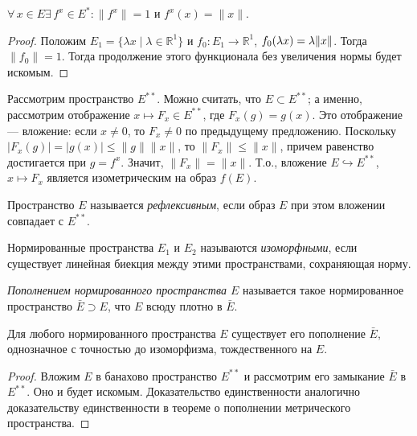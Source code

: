 \documentclass[12pt,titlepage, a4paper]{article}
\begin{document}
\begin{predl}
$\forall\,x\in E$\;\;$\exists\,f^x\in E^*:\|f^x\|=1$ и
$f^x(x)=\|x\|$.
\end{predl}

\begin{proof}
Положим $E_1=\{\lambda x\mid \lambda\in\mathbb{R}^1\}$ и $f_0\colon
E_1\to\mathbb{R}^1$, $f_0(\lambda x)\p=\lambda\|x\|$. Тогда
$\|f_0\|=1$. Тогда продолжение этого функционала без увеличения
нормы будет искомым.
\end{proof}

Рассмотрим пространство $E^{**}$. Можно считать, что $E\subset
E^{**}$; а именно, рассмотрим отображение $x\mapsto F_x\in E^{**}$,
где $F_x(g)=g(x)$. Это отображение --- вложение: если $x\neq 0$, то
$F_x\neq 0$ по предыдущему предложению. Поскольку
$|F_x(g)|=|g(x)|\leqslant \|g\|\|x\|$, то $\|F_x\|\leqslant \|x\|$,
причем равенство достигается при $g=f^x$. Значит, $\|F_x\|=\|x\|$.
Т.о., вложение $E\hookrightarrow E^{**}$, $x\mapsto F_x$ является
изометрическим на образ $f(E)$.

\begin{defen}
Пространство $E$ называется \emph{рефлексивным}, если образ $E$ при
этом вложении совпадает с $E^{**}$.
\end{defen}

\begin{defen}
Нормированные пространства $E_1$ и $E_2$ называются
\emph{изоморфными}, если существует линейная биекция между этими
пространствами, сохраняющая норму.
\end{defen}

\begin{defen}
\emph{Пополнением нормированного пространства $E$} называется такое
нормированное пространство $\bar{E}\supset E$, что $E$ всюду плотно
в $\bar{E}$.
\end{defen}

\begin{theorem}
Для любого нормированного пространства $E$ существует его пополнение
$\bar{E}$, однозначное с точностью до изоморфизма, тождественного на
$E$.
\end{theorem}

\begin{proof}
Вложим $E$ в банахово пространство $E^{**}$ и рассмотрим его
замыкание $\bar{E}$ в $E^{**}$. Оно и будет искомым. Доказательство
единственности аналогично доказательству единственности в теореме о
пополнении метрического пространства.
\end{proof}
\end{document}
